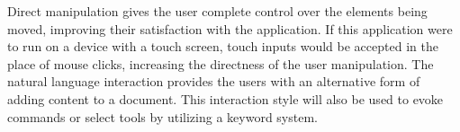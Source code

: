 \documentclass[11pt, oneside]{article}
\begin{document}
Direct manipulation gives the user complete control over the elements being moved, improving their satisfaction with the application. If this application were to run on a device with a touch screen, touch inputs would be accepted in the place of mouse clicks, increasing the directness of the user manipulation. The natural language interaction provides the users with an alternative form of adding content to a document. This interaction style will also be used to evoke commands or select tools by utilizing a keyword system. 


{}

\end{document}
